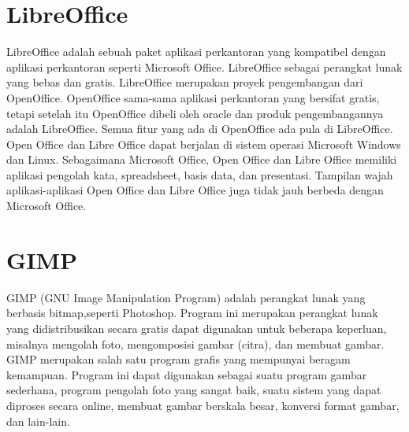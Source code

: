 \documentclass[11pt,fleqn]{book} %
\begin{document}
\section{LibreOffice}
\hspace{10pt} LibreOffice adalah sebuah paket aplikasi perkantoran yang kompatibel dengan aplikasi perkantoran seperti Microsoft Office. 
LibreOffice sebagai perangkat lunak yang bebas dan gratis. 
LibreOffice merupakan proyek pengembangan dari OpenOffice. 
OpenOffice sama-sama aplikasi perkantoran yang bersifat gratis, tetapi setelah itu OpenOffice dibeli oleh oracle dan produk pengembangannya adalah LibreOffice.  
Semua fitur yang ada di OpenOffice ada pula di LibreOffice. 
Open Office dan Libre Office dapat berjalan di sistem operasi Microsoft Windows dan Linux. 
Sebagaimana Microsoft Office, Open Office dan Libre Office memiliki aplikasi pengolah kata, spreadsheet, basis data, dan presentasi. 
Tampilan wajah aplikasi-aplikasi Open Office dan Libre Office juga tidak jauh berbeda dengan Microsoft Office. 
\section{GIMP}
\hspace{10pt}
GIMP (GNU Image Manipulation Program) adalah perangkat lunak yang berbasis bitmap,seperti Photoshop. 
Program ini merupakan perangkat lunak yang didistribusikan secara gratis dapat digunakan untuk beberapa keperluan, misalnya mengolah foto, mengomposisi gambar (citra), dan membuat gambar. 
GIMP merupakan salah satu program grafis yang mempunyai beragam kemampuan. 
Program ini dapat digunakan sebagai suatu program gambar sederhana, program pengolah foto yang sangat baik, suatu sistem yang dapat diproses secara online, membuat gambar berskala besar, konversi format gambar, dan lain-lain.
\end{document}
